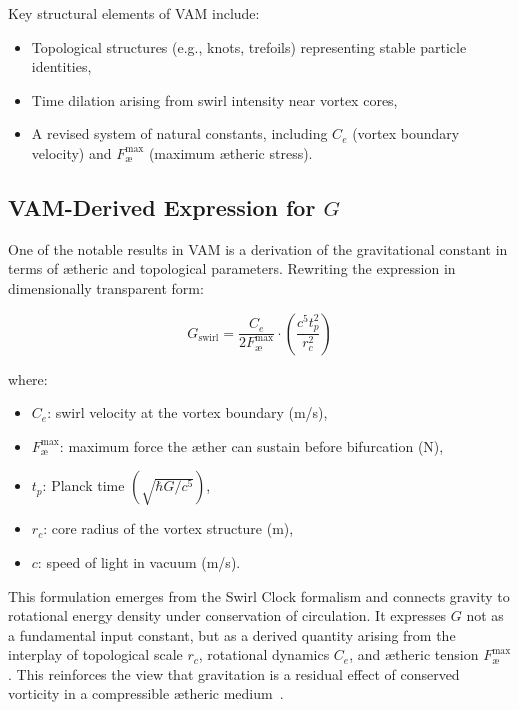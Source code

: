 \documentclass[preprint,notitlepage]{revtex4-2}
\begin{document}
Key structural elements of VAM include:
\begin{itemize}
    \item Topological structures (e.g., knots, trefoils) representing stable particle identities,
    \item Time dilation arising from swirl intensity near vortex cores,
    \item A revised system of natural constants, including \( C_e \) (vortex boundary velocity) and \( F^{\max}_{\text{\ae}} \) (maximum ætheric stress).
\end{itemize}

\subsection*{VAM-Derived Expression for \( G \)}

One of the notable results in VAM is a derivation of the gravitational constant in terms of ætheric and topological parameters. Rewriting the expression in dimensionally transparent form:

\begin{equation}
    G_\text{swirl} = \frac{C_e}{2 F^{\max}_{\text{\ae}}} \cdot \left( \frac{c^5 t_p^2}{r_c^2} \right)
\end{equation}

\noindent where:
\begin{itemize}
    \item \( C_e \): swirl velocity at the vortex boundary (m/s),
    \item \( F^{\max}_{\text{\ae}} \): maximum force the æther can sustain before bifurcation (N),
    \item \( t_p \): Planck time \( (\sqrt{\hbar G / c^5}) \),
    \item \( r_c \): core radius of the vortex structure (m),
    \item \( c \): speed of light in vacuum (m/s).
\end{itemize}

This formulation emerges from the Swirl Clock formalism and connects gravity to rotational energy density under conservation of circulation. It expresses \( G \) not as a fundamental input constant, but as a derived quantity arising from the interplay of topological scale \( r_c \), rotational dynamics \( C_e \), and ætheric tension \( F^{\max}_{\text{\ae}} \). This reinforces the view that gravitation is a residual effect of conserved vorticity in a compressible ætheric medium~\cite{iskandarani2025vam2}.
\end{document}
